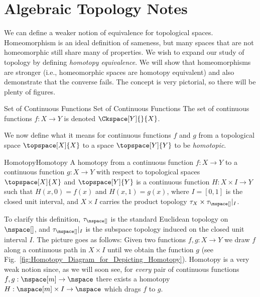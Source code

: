 \documentclass{article}                                                        %
\begin{document}
    \section{Algebraic Topology Notes}
        We can define a weaker notion of equivalence for topological spaces.
        Homeomorphism is an ideal definition of sameness, but many spaces that
        are not homeomorphic still share many of properties. We wish to expand
        our study of topology by defining \textit{homotopy equivalence}. We will
        show that homeomorphisms are stronger (i.e., homeomorphic spaces are
        homotopy equivalent) and also demonstrate that the converse fails. The
        concept is very pictorial, so there will be plenty of figures.
        \begin{fnotation}{Set of Continuous Functions}
                         {Set of Continuous Functions}
            The set of continuous functions $f:{X}\rightarrow{Y}$
            is denoted $\Ckspace[Y]{}{X}$.
        \end{fnotation}
        We now define what it means for continuous functions $f$ and $g$
        from a topological space $\topspace[X]{X}$ to a space
        $\topspace[Y]{Y}$ to be \textit{homotopic}.
        \begin{fdefinition}{Homotopy}{Homotopy}
            A homotopy from a continuous function $f:X\rightarrow{Y}$ to a
            continuous function $g:X\rightarrow{Y}$ with respect to topological
            spaces $\topspace[X]{X}$ and $\topspace[Y]{Y}$ is a continuous
            function $H:{X}\times{I}\rightarrow{Y}$ such that $H(x,0)=f(x)$ and
            $H(x,1)=g(x)$, where $I=[0,1]$ is the closed unit interval, and
            $X\times{I}$ carries the product topology
            $\tau_{X}\times\tau_{\nspace[]}|_{I}$.
        \end{fdefinition}
        To clarify this definition, $\tau_{\nspace[]}$ is the standard Euclidean
        topology on $\nspace[]$, and $\tau_{\nspace[]}|_{I}$ is the subspace
        topology induced on the closed unit interval $I$. The picture goes as
        follows: Given two functions $f,g:X\rightarrow{Y}$ we draw $f$ along a
        continuous path in $X\times{I}$ until we obtain the function $g$
        (see Fig.~\ref{fig:Homotopy_Diagram_for_Depicting_Homotopy}). Homotopy
        is a very weak notion since, as we will soon see, for \textit{every}
        pair of continuous functions $f,g:\nspace[m]\rightarrow\nspace$ there
        exists a homotopy $H:\nspace[m]\times{I}\rightarrow\nspace$ which drags
        $f$ to $g$.
\end{document}
